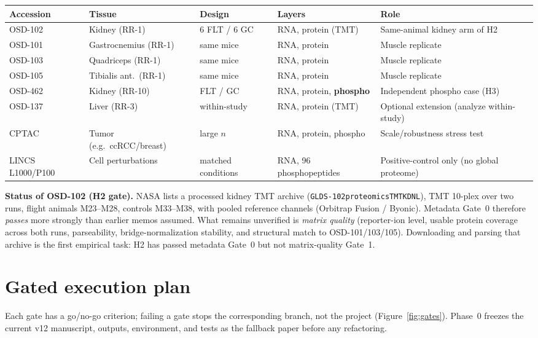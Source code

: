 \documentclass[11pt]{article}
\newcommand{\breakuscore}{\textunderscore\allowbreak}
\newcommand{\code}[1]{\texttt{\small\let\_\breakuscore #1}}
\begin{document}
\begin{center}\small
\begin{tabularx}{\textwidth}{@{}p{1.7cm} p{2.5cm} p{2.4cm} p{2.4cm} L@{}}
\toprule
\textbf{Accession} & \textbf{Tissue} & \textbf{Design} & \textbf{Layers} & \textbf{Role} \\
\midrule
OSD-102 & Kidney (RR-1) & 6 FLT / 6 GC & RNA, protein (TMT) & Same-animal kidney arm of H2 \\
OSD-101 & Gastrocnemius (RR-1) & same mice & RNA, protein & Muscle replicate \\
OSD-103 & Quadriceps (RR-1) & same mice & RNA, protein & Muscle replicate \\
OSD-105 & Tibialis ant.\ (RR-1) & same mice & RNA, protein & Muscle replicate \\
OSD-462 & Kidney (RR-10) & FLT / GC & RNA, protein, \textbf{phospho} & Independent phospho case (H3) \\
OSD-137 & Liver (RR-3) & within-study & RNA, protein (TMT) & Optional extension (analyze within-study) \\
CPTAC & Tumor (e.g.\ ccRCC/breast) & large $n$ & RNA, protein, phospho & Scale/robustness stress test \\
LINCS L1000/P100 & Cell perturbations & matched conditions & RNA, 96 phosphopeptides & Positive-control only (no global proteome) \\
\bottomrule
\end{tabularx}
\end{center}
\noindent \textbf{Status of OSD-102 (H2 gate).} NASA lists a processed kidney TMT archive
(\code{GLDS-102\_proteomics\_TMT\_KDNL}), TMT 10-plex over two runs, flight animals M23--M28, controls
M33--M38, with pooled reference channels (Orbitrap Fusion / Byonic). Metadata Gate~0 therefore \emph{passes}
more strongly than earlier memos assumed. What remains unverified is \emph{matrix quality} (reporter-ion
level, usable protein coverage across both runs, parseability, bridge-normalization stability, and
structural match to OSD-101/103/105). Downloading and parsing that archive is the first empirical task:
H2 has passed metadata Gate~0 but not matrix-quality Gate~1.

\section{Gated execution plan}
Each gate has a go/no-go criterion; failing a gate stops the corresponding branch, not the project
(Figure~\ref{fig:gates}). Phase~0 freezes the current v12 manuscript, outputs, environment, and tests as the
fallback paper before any refactoring.
\end{document}
